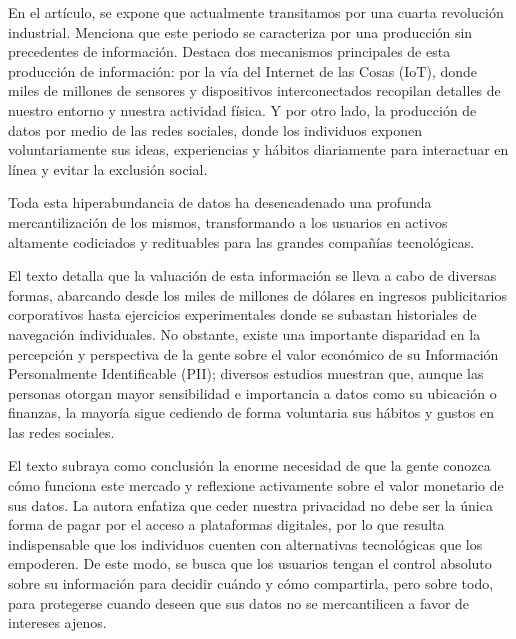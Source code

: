 En el artículo, se expone que actualmente transitamos por una cuarta revolución industrial.
Menciona que este periodo se caracteriza por una producción sin precedentes de información.
Destaca dos mecanismos principales de esta producción de información: por la vía del Internet de las Cosas (IoT), donde miles de millones de sensores y dispositivos interconectados recopilan detalles de nuestro entorno y nuestra actividad física.
Y por otro lado, la producción de datos por medio de las redes sociales, donde los individuos exponen voluntariamente sus ideas, experiencias y hábitos diariamente para interactuar en línea y evitar la exclusión social.

Toda esta hiperabundancia de datos ha desencadenado una profunda mercantilización de los mismos, transformando a los usuarios en activos altamente codiciados y redituables para las grandes compañías tecnológicas.

El texto detalla que la valuación de esta información se lleva a cabo de diversas formas, abarcando desde los miles de millones de dólares en ingresos publicitarios corporativos hasta ejercicios experimentales donde se subastan historiales de navegación individuales.
No obstante, existe una importante disparidad en la percepción y perspectiva de la gente sobre el valor económico de su Información Personalmente Identificable (PII); diversos estudios muestran que, aunque las personas otorgan mayor sensibilidad e importancia a datos como su ubicación o finanzas, la mayoría sigue cediendo de forma voluntaria sus hábitos y gustos en las redes sociales.

El texto subraya como conclusión la enorme necesidad de que la gente conozca cómo funciona este mercado y reflexione activamente sobre el valor monetario de sus datos.
La autora enfatiza que ceder nuestra privacidad no debe ser la única forma de pagar por el acceso a plataformas digitales, por lo que resulta indispensable que los individuos cuenten con alternativas tecnológicas que los empoderen.
De este modo, se busca que los usuarios tengan el control absoluto sobre su información para decidir cuándo y cómo compartirla, pero sobre todo, para protegerse cuando deseen que sus datos no se mercantilicen a favor de intereses ajenos.

